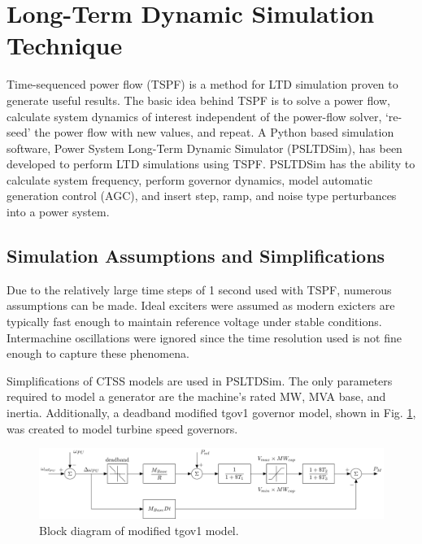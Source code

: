 \section{Long-Term Dynamic Simulation Technique}
Time-sequenced power flow (TSPF) is a method for LTD simulation proven to generate useful results\cite{DonnellyVoltageControl}.
The basic idea behind TSPF is to solve a power flow, calculate system dynamics of interest independent of the power-flow solver, `re-seed' the power flow with new values, and repeat.
A Python based simulation software, Power System Long-Term Dynamic Simulator (PSLTDSim), has been developed to perform LTD simulations using TSPF.
PSLTDSim has the ability to calculate system frequency, perform governor dynamics, model automatic generation control (AGC), and insert step, ramp, and noise type perturbances into a power system.

\subsection{Simulation Assumptions and Simplifications}
Due to the relatively large time steps of 1 second used with TSPF, numerous assumptions can be made.
Ideal exciters were assumed as modern exicters are typically fast enough to maintain reference voltage under stable conditions.
Intermachine oscillations were ignored since the time resolution used is not fine enough to capture these phenomena.

Simplifications of CTSS models are used in PSLTDSim.
The only parameters required to model a generator are the machine's rated MW, MVA base, and inertia.
Additionally, a deadband modified tgov1 governor model, shown in Fig. \ref{fig: tgov1BlockDiagram},  was created to model turbine speed governors.

\begin{figure}[!ht]
	\centering
	\includegraphics[width=\linewidth]{figures/tgov1DB}
	\caption{Block diagram of modified tgov1 model.}
	\label{fig: tgov1BlockDiagram}
\end{figure}

